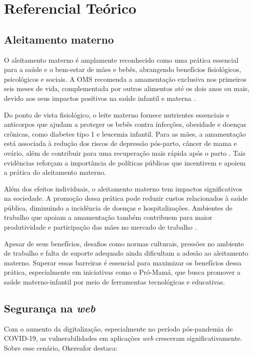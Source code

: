 \chapter{Referencial Teórico}

\section{Aleitamento materno}

O aleitamento materno é amplamente reconhecido como uma prática essencial para a saúde e o bem-estar de mães e bebês, abrangendo benefícios fisiológicos, psicológicos e sociais. A OMS recomenda a amamentação exclusiva nos primeiros seis meses de vida, complementada por outros alimentos até os dois anos ou mais, devido aos seus impactos positivos na saúde infantil e materna \cite{oms9241561300}.

Do ponto de vista fisiológico, o leite materno fornece nutrientes essenciais e anticorpos que ajudam a proteger os bebês contra infecções, obesidade e doenças crônicas, como diabetes tipo 1 e leucemia infantil. Para as mães, a amamentação está associada à redução dos riscos de depressão pós-parto, câncer de mama e ovário, além de contribuir para uma recuperação mais rápida após o parto \cite{oliveira2023impacto}. Tais evidências reforçam a importância de políticas públicas que incentivem e apoiem a prática do aleitamento materno.

Além dos efeitos individuais, o aleitamento materno tem impactos significativos na sociedade. A promoção dessa prática pode reduzir custos relacionados à saúde pública, diminuindo a incidência de doenças e hospitalizações. Ambientes de trabalho que apoiam a amamentação também contribuem para maior produtividade e participação das mães no mercado de trabalho \cite{masi2024}.

Apesar de seus benefícios, desafios como normas culturais, pressões no ambiente de trabalho e falta de suporte adequado ainda dificultam a adesão ao aleitamento materno. Superar essas barreiras é essencial para maximizar os benefícios dessa prática, especialmente em iniciativas como o Pró-Mamá, que busca promover a saúde materno-infantil por meio de ferramentas tecnológicas e educativas.

\section{Segurança na \emph{web}}

Com o aumento da digitalização, especialmente no período pós-pandemia de COVID-19, as vulnerabilidades em aplicações \emph{web} cresceram significativamente. Sobre esse cenário, Okereafor destaca:

